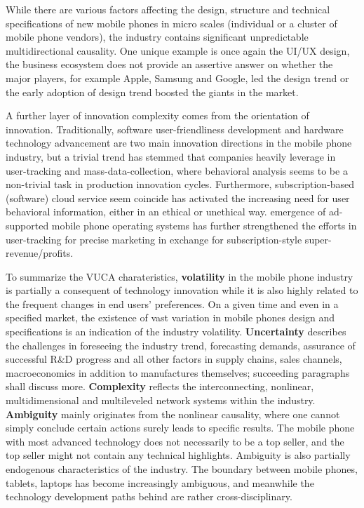\documentclass[utf8,english]{gradu3}
\begin{document}
While there are various factors affecting the design, structure and technical specifications of new mobile phones in micro scales (individual or a cluster of mobile phone vendors), the industry contains significant unpredictable multidirectional causality. One unique example is once again the UI/UX design, the business ecosystem does not provide an assertive answer on whether the major players, for example Apple, Samsung and Google, led the design trend or the early adoption of design trend boosted the giants in the market.

A further layer of innovation complexity comes from the orientation of innovation. Traditionally, software user-friendliness development and hardware technology advancement are two main innovation directions in the mobile phone industry, but a trivial trend has stemmed that companies heavily leverage in user-tracking and mass-data-collection, where behavioral analysis seems to be a non-trivial task in production innovation cycles. Furthermore, subscription-based (software) cloud service seem coincide has activated the increasing need for user behavioral information, either in an ethical or unethical way. emergence of ad-supported mobile phone operating systems has further strengthened the efforts in user-tracking for precise marketing in exchange for subscription-style super-revenue/profits. 

To summarize the VUCA charateristics, \textbf{volatility} in the mobile phone industry is partially a consequent of technology innovation while it is also highly related to the frequent changes in end users’ preferences. On a given time and even in a specified market, the existence of vast variation in mobile phones design and specifications is an indication of the industry volatility. \textbf{Uncertainty} describes the challenges in foreseeing the industry trend, forecasting demands, assurance of successful R\&D progress and all other factors in supply chains, sales channels, macroeconomics in addition to manufactures themselves; succeeding paragraphs shall discuss more. \textbf{Complexity} reflects the interconnecting, nonlinear, multidimensional and multileveled network systems within the industry. \textbf{Ambiguity} mainly originates from the nonlinear causality, where one cannot simply conclude certain actions surely leads to specific results. The mobile phone with most advanced technology does not necessarily to be a top seller, and the top seller might not contain any technical highlights. Ambiguity is also partially endogenous characteristics of the industry. The boundary between mobile phones, tablets, laptops has become increasingly ambiguous, and meanwhile the technology development paths behind are rather cross-disciplinary.
\end{document}
